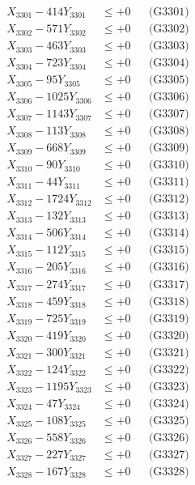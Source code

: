 \documentclass[a4paper,10pt]{article}
\begin{document}
{\begin{align}
\allowbreak
X_{3301} - 414Y_{3301} &\leq +0 && \text{(G3301)} \\
X_{3302} - 571Y_{3302} &\leq +0 && \text{(G3302)} \\
X_{3303} - 463Y_{3303} &\leq +0 && \text{(G3303)} \\
X_{3304} - 723Y_{3304} &\leq +0 && \text{(G3304)} \\
X_{3305} - 95Y_{3305} &\leq +0 && \text{(G3305)} \\
X_{3306} - 1025Y_{3306} &\leq +0 && \text{(G3306)} \\
X_{3307} - 1143Y_{3307} &\leq +0 && \text{(G3307)} \\
X_{3308} - 113Y_{3308} &\leq +0 && \text{(G3308)} \\
X_{3309} - 668Y_{3309} &\leq +0 && \text{(G3309)} \\
X_{3310} - 90Y_{3310} &\leq +0 && \text{(G3310)} \\
\allowbreak
X_{3311} - 44Y_{3311} &\leq +0 && \text{(G3311)} \\
X_{3312} - 1724Y_{3312} &\leq +0 && \text{(G3312)} \\
X_{3313} - 132Y_{3313} &\leq +0 && \text{(G3313)} \\
X_{3314} - 506Y_{3314} &\leq +0 && \text{(G3314)} \\
X_{3315} - 112Y_{3315} &\leq +0 && \text{(G3315)} \\
X_{3316} - 205Y_{3316} &\leq +0 && \text{(G3316)} \\
X_{3317} - 274Y_{3317} &\leq +0 && \text{(G3317)} \\
X_{3318} - 459Y_{3318} &\leq +0 && \text{(G3318)} \\
X_{3319} - 725Y_{3319} &\leq +0 && \text{(G3319)} \\
X_{3320} - 419Y_{3320} &\leq +0 && \text{(G3320)} \\
\allowbreak
X_{3321} - 300Y_{3321} &\leq +0 && \text{(G3321)} \\
X_{3322} - 124Y_{3322} &\leq +0 && \text{(G3322)} \\
X_{3323} - 1195Y_{3323} &\leq +0 && \text{(G3323)} \\
X_{3324} - 47Y_{3324} &\leq +0 && \text{(G3324)} \\
X_{3325} - 108Y_{3325} &\leq +0 && \text{(G3325)} \\
X_{3326} - 558Y_{3326} &\leq +0 && \text{(G3326)} \\
X_{3327} - 227Y_{3327} &\leq +0 && \text{(G3327)} \\
X_{3328} - 167Y_{3328} &\leq +0 && \text{(G3328)} \\

\end{align}}
\end{document}
